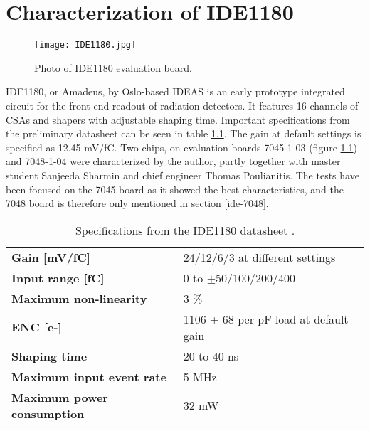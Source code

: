 \documentclass[../main/thesis.tex]{subfiles}
\begin{document}
\newchapter

\chapter{Characterization of IDE1180}
\label{ide}

\begin{figure}[h]
	\centering
	\texttt{[image: IDE1180.jpg]}
	\caption{Photo of IDE1180 evaluation board.}
	\label{fig-ide-picture}
\end{figure} 

IDE1180, or Amadeus, by Oslo-based IDEAS is an early prototype integrated circuit for the front-end readout of radiation detectors. It features 16 channels of \acrlong{CSA}s and shapers with adjustable shaping time. Important specifications from the preliminary datasheet can be seen in table \ref{tab-ide-specs}. The gain at default settings is specified as 12.45 mV/fC. Two chips, on evaluation boards 7045-1-03 (figure \ref{fig-ide-picture}) and 7048-1-04 were characterized by the author, partly together with master student Sanjeeda Sharmin and chief engineer Thomas Poulianitis. The tests have been focused on the 7045 board as it showed the best characteristics, and the 7048 board is therefore only mentioned in section \ref{ide-7048}. 

\begin{table}[h!]
	\begin{center}
		\caption{Specifications from the IDE1180 datasheet \citep{IDE1180}.}
		\label{tab-ide-specs}
		\begin{tabular}{ll}\toprule
			\textbf{Gain [mV/fC]} & 24/12/6/3 at different settings  \\ 
			\textbf{Input range [fC]}     & 0 to $\pm$50/100/200/400  \\
			\textbf{Maximum non-linearity}	&	3 \%	\\
			\textbf{\gls{ENC} [e-]}		& 	1106 + 68 per pF load at default gain \\
			\textbf{Shaping time} & 20 to 40 ns\\
			\textbf{Maximum input event rate}	&	5 MHz	\\
			\textbf{Maximum power consumption}	&	32 mW	\\
			 \bottomrule
		\end{tabular}
	\end{center}
\end{table}
\end{document}
